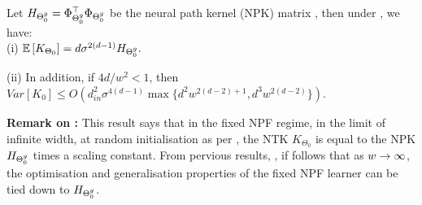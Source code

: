 \begin{theorem}\label{th:main} Let $H_{{\Theta}^g_0}=\Phi^\top_{{\Theta}^g_0}\Phi_{{\Theta}^g_0}$ be the neural path kernel (NPK) matrix , then under , we have:\\
(i) $\mathbb{E}\left[K_{\Theta_0}\right]=d\sigma^{2(d-1)} H_{{\Theta}^g_0}.$

(ii) In addition, if ${4d}/{w^2}<1$, then $Var\left[K_0\right]\leq O\left(d^2_{in}\sigma^{4(d-1)}\max\{d^2w^{2(d-2)+1}, d^3w^{2(d-2)}\}\right)$.
\end{theorem}
\textbf{Remark on :} This result says that in the fixed NPF regime, in the limit of infinite width, at random initialisation as per , the NTK $K_{\Theta_0}$ is equal to the NPK $H_{{\Theta}^g_0}$ times a scaling constant. From pervious results, \cite{arora2019exact,cao2019generalization}, if follows that as $w\rightarrow\infty$, the optimisation and generalisation properties of the fixed NPF learner can be tied down to $H_{{\Theta}^g_0}$. 

